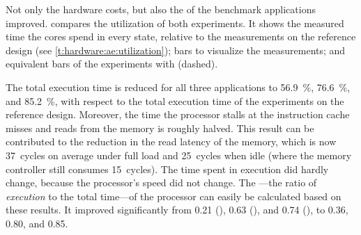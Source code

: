 
\label{s:hardware:warpfield:utilization}

Not only the hardware costs, but also the  of the benchmark applications improved.
 compares the utilization of both experiments.
It shows
the measured time the cores spend in every state, relative to the measurements on the reference design (see \vref{t:hardware:ae:utilization});
bars to visualize the measurements; and
equivalent bars of the experiments with \aethereal* (dashed).

The total execution time is reduced for all three applications to \SI{56.9}{\percent}, \SI{76.6}{\percent}, and \SI{85.2}{\percent}, with respect to the total execution time of the experiments on the reference design.
Moreover, the time the processor stalls at the instruction cache misses and reads from the memory is roughly halved.
This result can be contributed to the reduction in the read latency of the memory, which is now 37~cycles on average under full load and 25~cycles when idle (where the memory controller still consumes 15~cycles).
The time spent in execution did hardly change, because the processor's speed did not change.
The {}---the ratio of \emph{execution} to the total time---of the processor can easily be calculated based on these results.
It improved significantly from 0.21 (), 0.63 (), and 0.74 (), to 0.36, 0.80, and 0.85.

